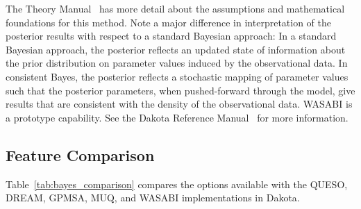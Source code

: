 The Theory Manual~\cite{TheoMan} has more detail about the assumptions and mathematical foundations 
for this method.  Note a major difference in interpretation of the posterior results with respect to 
a standard Bayesian approach:  In a standard Bayesian approach, the posterior reflects an updated state 
of information about the prior distribution on parameter values induced by the observational data.  
In consistent Bayes, the posterior reflects a stochastic mapping of parameter values such that the posterior 
parameters, when pushed-forward through the model, give results that are consistent with the density 
of the observational data. 
WASABI is a prototype capability.  See the Dakota Reference
Manual~\cite{RefMan} for more information.

\subsection{Feature Comparison}
Table~\ref{tab:bayes_comparison} compares the options available 
with the QUESO, DREAM, GPMSA, MUQ, and WASABI implementations in Dakota. 

